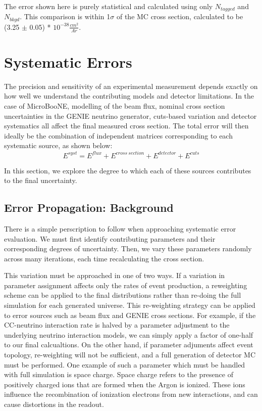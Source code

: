 \documentclass[12pt]{article}
\begin{document}
The error shown here is purely statistical and calculated using only $N_{tagged}$ and $N_{bkgd}$. This comparison is within 1$\sigma$ of the MC cross section, calculated to be (3.25 $\pm$ 0.05) * $10^{-38} \frac{cm^2}{Ar}$.

\clearpage
\section{Systematic Errors}
The precision and sensitivity of an experimental measurement depends exactly on how well we understand the contributing models and detector limitations. In the case of MicroBooNE, modelling of the beam flux, nominal cross section uncertainties in the GENIE neutrino generator, cuts-based variation and detector systematics all affect the final measured cross section. The total error will then ideally be the combination of independent matrices corresponding to each systematic source, as shown below:
\begin{equation}
\label{eq:sys_error}
E^{syst} = E^{flux} + E^{cross\ section} + E^{detector} + E^{cuts}
\end{equation}

\noindent In this section, we explore the degree to which each of these sources contributes to the final uncertainty. 
\subsection{Error Propagation: Background} 
There is a simple perscription to follow when approaching systematic error evaluation. We must first identify contributing parameters and their corresponding degrees of uncertainty.  Then, we vary these parameters randomly across many iterations, each time recalculating the cross section.
\par This variation must be approached in one of two ways. If a variation in parameter assignment affects only the rates of event production, a reweighting scheme can be applied to the final distributions rather than re-doing the full simulation for each generated universe.  This re-weighting strategy can be applied to error sources such as beam flux and GENIE cross sections.  For example, if the CC-neutrino interaction rate is halved by a parameter adjustment to the underlying neutrino interaction models, we can simply apply a factor of one-half to our final calcualtions.  On the other hand, if parameter adjuments affect event topology, re-weighting will not be sufficient, and a full generation of detector MC must be performed. One example of such a parameter which must be handled with full simulation is space charge. Space charge refers to the presence of positively charged ions that are formed when the Argon is ionized.  These ions influence the recombination of ionization electrons from new interactions, and can cause distortions in the readout.
\end{document}
